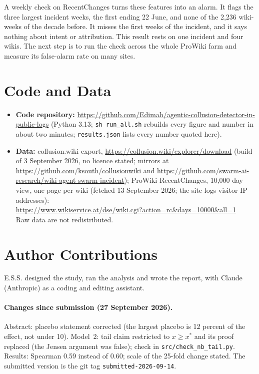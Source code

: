\documentclass[10pt,a4paper]{article}
\begin{document}
A weekly check on RecentChanges turns these features into an alarm. It flags the three largest incident weeks, the first ending 22 June, and none of the 2,236 wiki-weeks of the decade before. It misses the first weeks of the incident, and it says nothing about intent or attribution. This result rests on one incident and four wikis. The next step is to run the check across the whole ProWiki farm and measure its false-alarm rate on many sites.

\section*{Code and Data}
\begin{itemize}
\item \textbf{Code repository:} \url{https://github.com/Edimah/agentic-collusion-detector-in-public-logs} (Python 3.13; \texttt{sh run\_all.sh} rebuilds every figure and number in about two minutes; \texttt{results.json} lists every number quoted here).
\item \textbf{Data:} collusion.wiki export, \url{https://collusion.wiki/explorer/download} (build of 3 September 2026, no licence stated; mirrors at \url{https://github.com/ksouth/collusionwiki} and \url{https://github.com/swarm-ai-research/wiki-agent-swarm-incident}); ProWiki RecentChanges, 10,000-day view, one page per wiki (fetched 13 September 2026; the site logs visitor IP addresses):\\ \url{https://www.wikiservice.at/dse/wiki.cgi?action=rc&days=10000&all=1}\\ Raw data are not redistributed.
\end{itemize}

\section*{Author Contributions}
E.S.S. designed the study, ran the analysis and wrote the report, with Claude (Anthropic) as a coding and editing assistant.

\paragraph{Changes since submission (27 September 2026).} Abstract: placebo statement corrected (the largest placebo is 12 percent of the effect, not under 10). Model~2: tail claim restricted to $x \ge x^*$ and its proof replaced (the Jensen argument was false); check in \texttt{src/check\_nb\_tail.py}. Results: Spearman 0.59 instead of 0.60; scale of the 25-fold change stated. The submitted version is the git tag \texttt{submitted-2026-09-14}.
\end{document}
